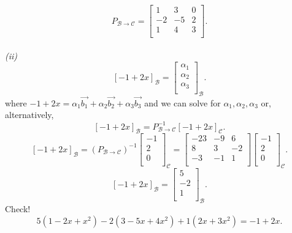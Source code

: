 \documentclass{report}
\begin{document}
{    \[
    P _{ \mathcal{B} \to \mathcal{C}} = \begin{bmatrix}
    1 & 3 & 0\\
    -2 & -5 & 2\\
    1 & 4 & 3\\
    \end{bmatrix}
    .\] 
\\
\textit{(ii)}\\
\[
 \left[ -1 +2x \right] _{ \mathcal{B}} = \begin{bmatrix}
 \alpha_1\\
 \alpha_2\\
 \alpha_3\\
 \end{bmatrix}
  _{ \mathcal{B}} 
.\] 
where $ -1+2x = \alpha_1 \vec{ b_1}+ \alpha_2 \vec{ b_2} + \alpha_3 \vec{ b_3}  $ and we can solve for $ \alpha_1, \alpha_2 , \alpha_3$ or, alternatively, 
\[
 \left[ -1 +2x \right] _{ \mathcal{B}} = P _{ \mathcal{B} \to \mathcal{C}} ^{-1} \left[ -1 +2x  \right] _{ \mathcal{C}}
.\] 
\[
 \left[ -1 + 2x \right] _{ \mathcal{B}} = \left(  P _{ \mathcal{B} \to \mathcal{C}} \right) ^{-1}  \begin{bmatrix}
 -1\\
 2\\
 0\\
 \end{bmatrix}
  _{ \mathcal{C}} = \begin{bmatrix}
  -23 & -9 & 6\\
  8 & 3 & -2\\
  -3 & -1 & 1\\
  \end{bmatrix} \begin{bmatrix}
  -1\\
  2\\
  0\\
  \end{bmatrix}        _{ \mathcal{C}}
.\] 
\[
 \left[ -1 +2x \right] _{ \mathcal{B}} = \begin{bmatrix}
 5\\
 -2\\
 1\\
 \end{bmatrix}
 _{ \mathcal{B}}
.\] 
Check!\\
\[
5 \left( 1 -2x +x^2 \right) -2 \left( 3-5x+4x^2 \right) +1 \left( 2x+3x^2 \right) = -1 +2x
.\] 

  }
  
\end{document}
